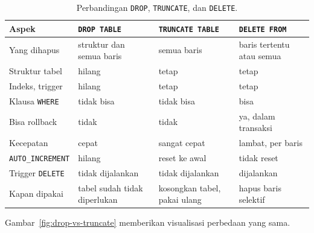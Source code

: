 \documentclass[11pt,a4paper]{article}
\begin{document}
\begin{table}[H]
	\centering
	\caption{Perbandingan \texttt{DROP}, \texttt{TRUNCATE}, dan \texttt{DELETE}.}
	\label{tab:drop-truncate-delete}
	\footnotesize
	\begin{tabularx}{\textwidth}{l X X X}
		\toprule
		Aspek                    & \texttt{DROP TABLE}          & \texttt{TRUNCATE TABLE}      & \texttt{DELETE FROM}      \\
		\midrule
		Yang dihapus             & struktur dan semua baris     & semua baris                  & baris tertentu atau semua \\
		Struktur tabel           & hilang                       & tetap                        & tetap                     \\
		Indeks, trigger          & hilang                       & tetap                        & tetap                     \\
		Klausa \texttt{WHERE}    & tidak bisa                   & tidak bisa                   & bisa                      \\
		Bisa rollback            & tidak                        & tidak                        & ya, dalam transaksi       \\
		Kecepatan                & cepat                        & sangat cepat                 & lambat, per baris         \\
		\texttt{AUTO\_INCREMENT} & hilang                       & reset ke awal                & tidak reset               \\
		Trigger \texttt{DELETE}  & tidak dijalankan             & tidak dijalankan             & dijalankan                \\
		Kapan dipakai            & tabel sudah tidak diperlukan & kosongkan tabel, pakai ulang & hapus baris selektif      \\
		\bottomrule
	\end{tabularx}
\end{table}

Gambar~\ref{fig:drop-vs-truncate} memberikan visualisasi perbedaan yang sama.
\end{document}

